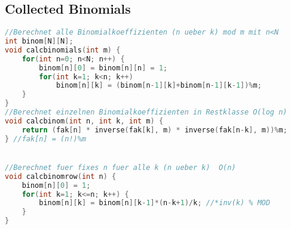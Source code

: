 \subsection{Collected Binomials}
\begin{lstlisting}[language=C++]
  //Berechnet alle Binomialkoeffizienten (n ueber k) mod m mit n<N
int binom[N][N];
void calcbinomials(int m) {
	for(int n=0; n<N; n++) {
		binom[n][0] = binom[n][n] = 1;
		for(int k=1; k<n; k++)
			binom[n][k] = (binom[n-1][k]+binom[n-1][k-1])%m;
	}
}
//Berechnet einzelnen Binomialkoeffizienten in Restklasse O(log n)
void calcbinom(int n, int k, int m) {
	return (fak[n] * inverse(fak[k], m) * inverse(fak[n-k], m))%m;
} //fak[n] = (n!)%m


//Berechnet fuer fixes n fuer alle k (n ueber k)  O(n)
void calcbinomrow(int n) {
	binom[n][0] = 1;
	for(int k=1; k<=n; k++) {
		binom[n][k] = binom[n][k-1]*(n-k+1)/k; //*inv(k) % MOD
	}
}
\end{lstlisting}
